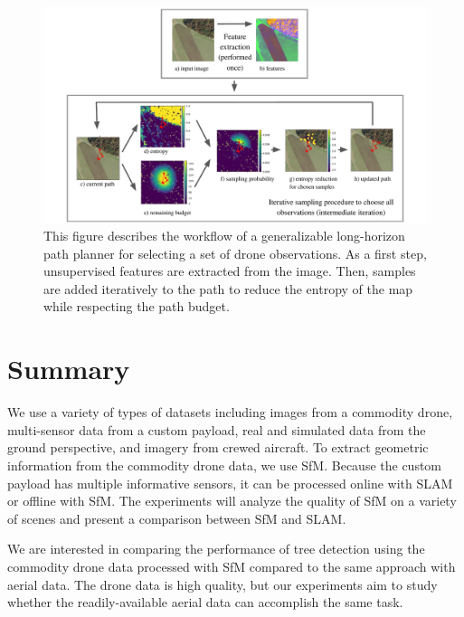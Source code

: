 \begin{figure}
    \centering
    \includegraphics[width=\textwidth, clip, trim={1.5cm, 0, 1.5cm, 0}]{figs/methods/IPP/RAPTORS_concept_figure.pdf}
    \caption{This figure describes the workflow of a generalizable long-horizon path planner for selecting a set of drone observations. As a first step, unsupervised features are extracted from the image. Then, samples are added iteratively to the path to reduce the entropy of the map while respecting the path budget.}
    \label{fig:methods:IPP_raptors_overview}
\end{figure}
    

\section{Summary}
We use a variety of types of datasets including images from a commodity drone, multi-sensor data from a custom payload, real and simulated data from the ground perspective, and imagery from crewed aircraft. To extract geometric information from the commodity drone data, we use SfM. Because the custom payload has multiple informative sensors, it can be processed online with SLAM or offline with SfM. The experiments will analyze the quality of SfM on a variety of scenes and present a comparison between SfM and SLAM. 

We are interested in comparing the performance of tree detection using the commodity drone data processed with SfM compared to the same approach with aerial data. The drone data is high quality, but our experiments aim to study whether the readily-available aerial data can accomplish the same task.

